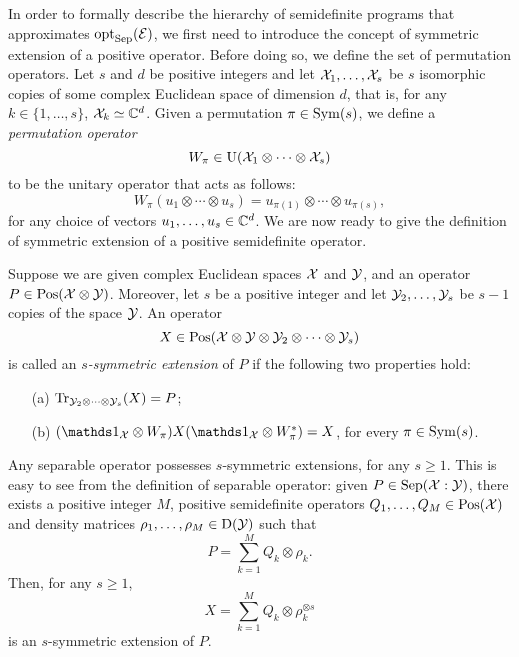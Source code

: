In order to formally describe the hierarchy of semidefinite programs that 
approximates $\operatorname{opt}_{\mathrm{Sep}}(\mathcal{E})$, we first need to introduce the concept of 
symmetric extension of a positive operator.
Before doing so, we define the set of permutation operators.
Let $s$ and $d$ be positive integers and let $\mathcal{X}_{1}, \ldots, \mathcal{X}_{s}$ be $s$ isomorphic 
copies of some complex Euclidean space of dimension $d$, that is, 
for any $k \in \{1, \ldots, s \}$, $\mathcal{X}_{k} \simeq \mathbb{C}^{d}$. 
Given a permutation $\pi\in\mathrm{Sym}(s)$, we define
a \emph{permutation operator} 
\begin{equation}
  W_{\pi} \in \mathrm{U}(\mathcal{X}_{1}\otimes\cdots\otimes\mathcal{X}_{s})
\end{equation}
to be the unitary operator that acts as follows:
\begin{equation}
  W_{\pi}(u_{1}\otimes\cdots\otimes u_{s}) = u_{\pi(1)}\otimes\cdots
    \otimes u_{\pi(s)},
\end{equation}
for any choice of vectors $u_{1}, \ldots, u_{s}\in\mathbb{C}^{d}$.
We are now ready to give the definition of symmetric extension of a positive 
semidefinite operator. 

\begin{definition}
  Suppose we are given complex Euclidean spaces $\mathcal{X}$ and $\mathcal{Y}$, and an operator
  $P\in\mathrm{Pos}(\mathcal{X}\otimes\mathcal{Y})$. Moreover, let $s$ be a positive integer and let 
  $\mathcal{Y}_{2},\ldots,\mathcal{Y}_{s}$ be $s-1$ copies of the space $\mathcal{Y}$. An operator 
  \begin{equation}
    X \in \mathrm{Pos}(\mathcal{X}\otimes\mathcal{Y}\otimes\mathcal{Y}_{2}\otimes\cdots\otimes\mathcal{Y}_{s})
  \end{equation}
  is called an \emph{$s$-symmetric extension} of $P$ if the following two 
  properties hold:
  \begin{itemize}
    \item[(a)] $\operatorname{Tr}_{\mathcal{Y}_{2}\otimes\cdots\otimes\mathcal{Y}_{s}}(X) = P$;
    \item[(b)] $(\I_{\X}\otimes W_{\pi})X(\I_{\X}\otimes W_{\pi}^{\ast}) = X$,
      for every $\pi\in\mathrm{Sym}(s)$.
  \end{itemize}
\end{definition}

Any separable operator possesses $s$-symmetric extensions, for any $s \geq 1$. 
This is easy to see from the definition of separable operator: given 
$P\in\mathrm{Sep}(\mathcal{X}:\mathcal{Y})$, there exists a positive integer $M$, positive semidefinite 
operators $Q_1,\ldots,Q_M \in \mathrm{Pos}(\mathcal{X})$ and density matrices $\rho_1,\ldots, \rho_M\in\mathrm{D}(\mathcal{Y})$ 
such that
\begin{equation}
  P = \sum_{k = 1}^M Q_{k} \otimes \rho_{k}.
\end{equation} 
Then, for any $s \geq 1$,
\begin{equation}
\label{eq:X-extension}
  X = \sum_{k = 1}^M Q_k \otimes \rho_{k}^{\otimes s}
\end{equation}
is an $s$-symmetric extension of $P$.

